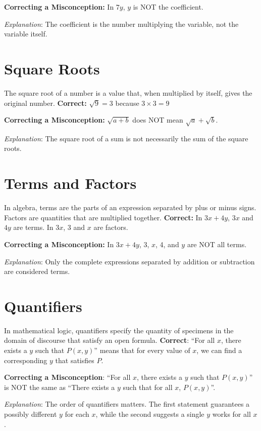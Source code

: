 \documentclass[12pt]{article}
\begin{document}
\textbf{Correcting a Misconception:} In \(7y\), \(y\) is NOT the coefficient.

\textit{Explanation}: The coefficient is the number multiplying the variable, not the variable itself.

\section*{Square Roots}
The square root of a number is a value that, when multiplied by itself, gives the original number.
\textbf{Correct:} \(\sqrt{9} = 3\) because \(3 \times 3 = 9\)

\textbf{Correcting a Misconception:} \(\sqrt{a + b}\) does NOT mean \(\sqrt{a} + \sqrt{b}\).

\textit{Explanation}: The square root of a sum is not necessarily the sum of the square roots.

\section*{Terms and Factors}
In algebra, terms are the parts of an expression separated by plus or minus signs. Factors are quantities that are multiplied together.
\textbf{Correct:} In \(3x + 4y\), \(3x\) and \(4y\) are terms. In \(3x\), 3 and \(x\) are factors.

\textbf{Correcting a Misconception:} In \(3x + 4y\), 3, \(x\), 4, and \(y\) are NOT all terms.

\textit{Explanation}: Only the complete expressions separated by addition or subtraction are considered terms.

\section*{Quantifiers}
In mathematical logic, quantifiers specify the quantity of specimens in the domain of discourse that satisfy an open formula.
\textbf{Correct}: ``For all \(x\), there exists a \(y\) such that \(P(x,y)\)'' means that for every value of \(x\), we can find a corresponding \(y\) that satisfies \(P\).

\textbf{Correcting a Misconception}: ``For all \(x\), there exists a \(y\) such that \(P(x,y)\)'' is NOT the same as ``There exists a \(y\) such that for all \(x\), \(P(x,y)\)''.

\textit{Explanation}: The order of quantifiers matters. The first statement guarantees a possibly different \(y\) for each \(x\), while the second suggests a single \(y\) works for all \(x\).
\end{document}
